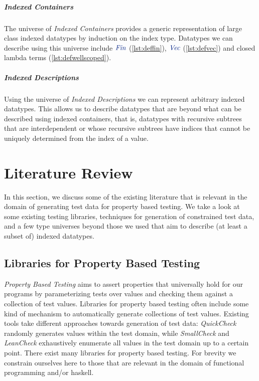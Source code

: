 \documentclass[a4paper,msc,twosized=semi]{uustthesis}
\newcommand*{\mathcolor}{}
\def\mathcolor#1#{\mathcoloraux{#1}}
\newcommand*{\mathcoloraux}[3]{%
  \protect\leavevmode
  \begingroup
    \color#1{#2}#3%
  \endgroup
}
\newcommand{\HSCon}[1]{\mathcolor{hsblue3}{\mathit{#1}}}
\begin{document}
  \paragraph{Indexed Containers}
    The universe of \emph{Indexed Containers} \cite{altenkirch2015indexed} 
    provides a generic representation of large class indexed datatypes by 
    induction on the index type. Datatypes we can describe using this universe 
    include \ensuremath{\HSCon{Fin}} (\cref{lst:deffin}), \ensuremath{\HSCon{Vec}} (\cref{lst:defvec}) and closed 
    lambda terms (\cref{lst:defwellscoped}).

  \paragraph{Indexed Descriptions}
    Using the universe of \emph{Indexed Descriptions} \cite{dagand2013cosmology}
    we can represent arbitrary indexed datatypes. This allows us to describe 
    datatypes that are beyond what can be described using indexed containers, 
    that is, datatypes with recursive subtrees that are interdependent or whose 
    recursive subtrees have indices that cannot be uniquely determined from the 
    index of a value. 

\chapter{Literature Review}
In this section, we discuss some of the existing literature that is relevant in the 
domain of generating test data for property based testing. We take a look at some 
existing testing libraries, techniques for generation of constrained test data, and a 
few type universes beyond those we used that aim to describe (at least a subset of) 
indexed datatypes. 

\section{Libraries for Property Based Testing}

  \textit{Property Based Testing} aims to assert properties that universally hold for 
  our programs by parameterizing tests over values and checking them against a 
  collection of test values. Libraries for property based testing often include some 
  kind of mechanism to automatically generate collections of test values. Existing 
  tools take different approaches towards generation of test data: \textit{QuickCheck} 
  \cite{claessen2011quickcheck} randomly generates values within the test domain, 
  while \textit{SmallCheck} \cite{runciman2008smallcheck} and \textit{LeanCheck} \cite
  {matela2017tools} exhaustively enumerate all values in the test domain up to a 
  certain point. There exist many libraries for property based testing. For brevity we 
  constrain ourselves here to those that are relevant in the domain of functional 
  programming and/or haskell. 
\end{document}

